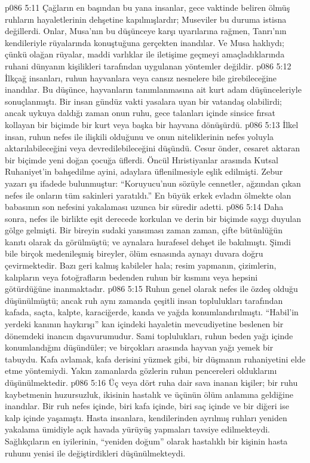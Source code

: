 \vs p086 5:11 Çağların en başından bu yana insanlar, gece vaktinde beliren ölmüş ruhların hayaletlerinin dehşetine kapılmışlardır; Museviler bu duruma istisna değillerdi. Onlar, Musa’nın bu düşünceye karşı uyarılarına rağmen, Tanrı’nın kendileriyle rüyalarında konuştuğuna gerçekten inandılar. Ve Musa haklıydı; çünkü olağan rüyalar, maddi varlıklar ile iletişime geçmeyi amaçladıklarında ruhani dünyanın kişilikleri tarafından uygulanan yöntemler değildir.
\vs p086 5:12 İlkçağ insanları, ruhun hayvanlara veya cansız nesnelere bile girebileceğine inandılar. Bu düşünce, hayvanların tanımlanmasına ait kurt adam düşünceleriyle sonuçlanmıştı. Bir insan gündüz vakti yasalara uyan bir vatandaş olabilirdi; ancak uykuya daldığı zaman onun ruhu, gece talanları içinde sinsice fırsat kollayan bir biçimde bir kurt veya başka bir hayvana dönüşürdü.
\vs p086 5:13 İlkel insan, ruhun nefes ile ilişkili olduğunu ve onun niteliklerinin nefes yoluyla aktarılabileceğini veya devredilebileceğini düşündü. Cesur önder, cesaret aktaran bir biçimde yeni doğan çocuğa üflerdi. Öncül Hıristiyanlar arasında Kutsal Ruhaniyet’in bahşedilme ayini, adaylara üflenilmesiyle eşlik edilmişti. Zebur yazarı şu ifadede bulunmuştur: “Koruyucu’nun sözüyle cennetler, ağzından çıkan nefes ile onların tüm sakinleri yaratıldı.” En büyük erkek evladın ölmekte olan babasının son nefesini yakalaması uzunca bir süredir adetti.
\vs p086 5:14 Daha sonra, nefes ile birlikte eşit derecede korkulan ve derin bir biçimde saygı duyulan gölge gelmişti. Bir bireyin sudaki yansıması zaman zaman, çifte bütünlüğün kanıtı olarak da görülmüştü; ve aynalara hurafesel dehşet ile bakılmıştı. Şimdi bile birçok medenileşmiş bireyler, ölüm esnasında aynayı duvara doğru çevirmektedir. Bazı geri kalmış kabileler hala; resim yapmanın, çizimlerin, kalıpların veya fotoğrafların bedenden ruhun bir kısmını veya hepsini götürdüğüne inanmaktadır.
\vs p086 5:15 Ruhun genel olarak nefes ile özdeş olduğu düşünülmüştü; ancak ruh aynı zamanda çeşitli insan toplulukları tarafından kafada, saçta, kalpte, karaciğerde, kanda ve yağda konumlandırılmıştı. “Habil’in yerdeki kanının haykırışı” kan içindeki hayaletin mevcudiyetine beslenen bir dönemdeki inancın dışavurumudur. Sami toplulukları, ruhun beden yağı içinde konumlandığını düşündüler; ve birçokları arasında hayvan yağı yemek bir tabuydu. Kafa avlamak, kafa derisini yüzmek gibi, bir düşmanın ruhaniyetini elde etme yöntemiydi. Yakın zamanlarda gözlerin ruhun pencereleri olduklarını düşünülmektedir.
\vs p086 5:16 Üç veya dört ruha dair sava inanan kişiler; bir ruhu kaybetmenin huzursuzluk, ikisinin hastalık ve üçünün ölüm anlamına geldiğine inandılar. Bir ruh nefes içinde, biri kafa içinde, biri saç içinde ve bir diğeri ise kalp içinde yaşamıştı. Hasta insanlara, kendilerinden ayrılmış ruhları yeniden yakalama ümidiyle açık havada yürüyüş yapmaları tavsiye edilmekteydi. Sağlıkçıların en iyilerinin, “yeniden doğum” olarak hastalıklı bir kişinin hasta ruhunu yenisi ile değiştirdikleri düşünülmekteydi.
